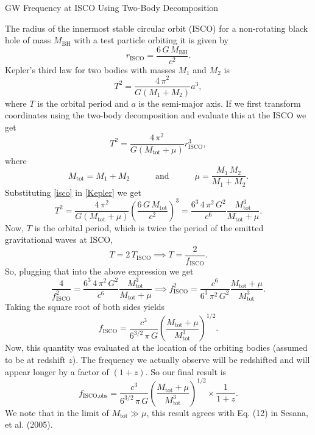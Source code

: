 \documentclass{article}
\newcommand{\isco}{\text{ISCO}}
\newcommand{\tot}{\text{tot}}
\begin{document}
\flushleft

\begin{center}
\Large{GW Frequency at ISCO Using Two-Body Decomposition}
\end{center}
\vspace{1cm}
The radius of the innermost stable circular orbit (ISCO) for a non-rotating black hole of mass $M_{\text{BH}}$ with a test particle orbiting it is given by
\begin{equation}\label{isco}
r_{\isco}=\frac{6\,G\,M_{\text{BH}}}{c^{2}}.
\end{equation}
Kepler's third law for two bodies with masses $M_{1}$ and $M_{2}$ is
\begin{equation}
T^{2}=\frac{4\,\pi^{2}}{G\left(M_{1}+M_{2}\right)}a^{3},
\end{equation}
where $T$ is the orbital period and $a$ is the semi-major axis. If we first transform coordinates using the two-body decomposition and evaluate this at the ISCO we get
\begin{equation}\label{Kepler}
T^{2}=\frac{4\,\pi^{2}}{G\left(M_{\tot}+\mu\right)}r_{\isco}^{3},
\end{equation}
where
\begin{equation}
M_{\tot}=M_{1}+M_{2}\hspace{3em}\text{and}\hspace{3em}\mu=\frac{M_{1}\,M_{2}}{M_{1}+M_{2}}.
\end{equation}
Substituting \eqref{isco} in \eqref{Kepler} we get
\begin{equation}
T^{2}=\frac{4\,\pi^{2}}{G\left(M_{\tot}+\mu\right)}\left(\frac{6\,G\,M_{\tot}}{c^{2}}\right)^{3}=\frac{6^{3}\,4\,\pi^{2}\,G^{2}}{c^{6}}\frac{M_{\tot}^{3}}{M_{\tot}+\mu}.
\end{equation}
Now, $T$ is the orbital period, which is twice the period of the emitted gravitational waves at ISCO,
\begin{equation}
T=2\,T_{\isco}\implies T=\frac{2}{f_{\isco}}.
\end{equation}
So, plugging that into the above expression we get
\begin{equation}
\frac{4}{f_{\isco}^{2}}=\frac{6^{3}\,4\,\pi^{2}\,G^{2}}{c^{6}}\frac{M_{\tot}^{3}}{M_{\tot}+\mu}\implies f_{\isco}^{2}=\frac{c^{6}}{6^{3}\,\pi^{2}\,G^{2}}\frac{M_{\tot}+\mu}{M_{\tot}^{3}}.
\end{equation}
Taking the square root of both sides yields
\begin{equation}
f_{\isco}=\frac{c^{3}}{6^{3/2}\,\pi\,G}\left(\frac{M_{\tot}+\mu}{M_{\tot}^{3}}\right)^{1/2}.
\end{equation}
Now, this quantity was evaluated at the location of the orbiting bodies (assumed to be at redshift $z$). The frequency we actually observe will be redshifted and will appear longer by a factor of $\left(1+z\right)$. So our final result is
\begin{equation}
\boxed{f_{\isco,\text{obs}}=\frac{c^{3}}{6^{3/2}\,\pi\,G}\left(\frac{M_{\tot}+\mu}{M_{\tot}^{3}}\right)^{1/2}\times\frac{1}{1+z}.}
\end{equation}
We note that in the limit of $M_{\tot}\gg\mu$, this result agrees with Eq. (12) in Sesana, et al. (2005).
\end{document}

